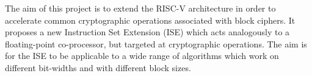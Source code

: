 

The aim of this project is to
extend the RISC-V architecture in order to accelerate common cryptographic
operations associated with block ciphers.
It proposes a new Instruction Set Extension (ISE)
which acts analogously to a floating-point co-processor,
but targeted at cryptographic operations.
The aim is for the ISE to be applicable to a wide range of algorithms
which work on different bit-widths and with different block sizes.

